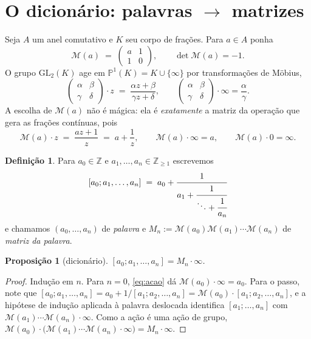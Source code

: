 \documentclass[11pt,a4paper]{article}
\theoremstyle{plain}
\newtheorem{proposicao}[teorema]{Proposição}
\theoremstyle{definition}
\newtheorem{definicao}[teorema]{Definição}
\theoremstyle{remark}
\newcommand{\Z}{\mathbb{Z}}
\newcommand{\Pj}{\mathbb{P}^1}
\newcommand{\Mat}[1]{\mathcal{M}(#1)}
\newcommand{\GL}{\mathrm{GL}}
\newcommand{\cf}[2]{[#1;#2]}
\begin{document}
\section{O dicionário: palavras \texorpdfstring{$\to$}{->} matrizes}\label{sec:dic}

Seja $A$ um anel comutativo e $K$ seu corpo de frações. Para $a \in A$ ponha
\[
  \Mat{a} \;=\; \begin{pmatrix} a & 1 \\ 1 & 0 \end{pmatrix},
  \qquad \det \Mat{a} = -1 .
\]
O grupo $\GL_2(K)$ age em $\Pj(K) = K \cup \{\infty\}$ por transformações de Möbius,
\[
  \begin{pmatrix} \alpha & \beta \\ \gamma & \delta \end{pmatrix}\cdot z
  \;=\; \frac{\alpha z + \beta}{\gamma z + \delta},
  \qquad
  \begin{pmatrix} \alpha & \beta \\ \gamma & \delta \end{pmatrix}\cdot \infty = \frac{\alpha}{\gamma}.
\]
A escolha de $\Mat{a}$ não é mágica: ela é \emph{exatamente} a matriz da operação que gera as
frações contínuas, pois
\begin{equation}\label{eq:acao}
  \Mat{a}\cdot z \;=\; \frac{az+1}{z} \;=\; a + \frac{1}{z},
  \qquad \Mat{a}\cdot\infty = a, \qquad \Mat{a}\cdot 0 = \infty .
\end{equation}

\begin{definicao}
Para $a_0 \in \Z$ e $a_1,\dots,a_n \in \Z_{\geq 1}$ escrevemos
\[
  \cf{a_0}{a_1,\dots,a_n} \;=\; a_0 + \cfrac{1}{a_1 + \cfrac{1}{\ddots + \cfrac{1}{a_n}}}
\]
e chamamos $(a_0,\dots,a_n)$ de \emph{palavra} e $M_n := \Mat{a_0}\Mat{a_1}\cdots\Mat{a_n}$
de \emph{matriz da palavra}.
\end{definicao}

\begin{proposicao}[dicionário]\label{prop:dic}
$\cf{a_0}{a_1,\dots,a_n} = M_n \cdot \infty$.
\end{proposicao}

\begin{proof}
Indução em $n$. Para $n=0$, \eqref{eq:acao} dá $\Mat{a_0}\cdot\infty = a_0$.
Para o passo, note que $\cf{a_0}{a_1,\dots,a_n} = a_0 + 1/\cf{a_1}{a_2,\dots,a_n}
= \Mat{a_0}\cdot \cf{a_1}{a_2,\dots,a_n}$, e a hipótese de indução aplicada à palavra
deslocada identifica $\cf{a_1}{\dots,a_n}$ com $\Mat{a_1}\cdots\Mat{a_n}\cdot\infty$.
Como a ação é uma ação de grupo, $\Mat{a_0}\cdot\big(\Mat{a_1}\cdots\Mat{a_n}\cdot\infty\big)
= M_n\cdot\infty$.
\end{proof}
\end{document}
